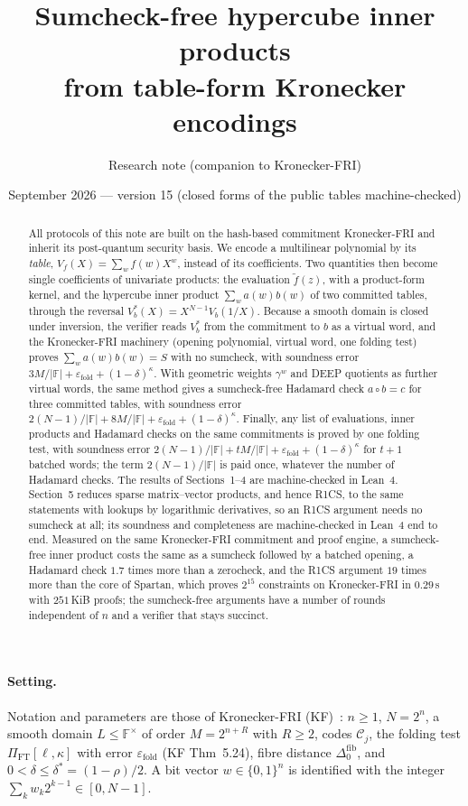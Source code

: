 \documentclass[11pt]{article}
\title{Sumcheck-free hypercube inner products\\ from table-form Kronecker encodings}
\author{Research note (companion to Kronecker-FRI)}
\date{September 2026 --- version 15 (closed forms of the public tables machine-checked)}
\theoremstyle{definition}
\newcommand{\F}{\mathbb{F}}
\newcommand{\Cc}{\mathcal{C}}
\newcommand{\iv}[2]{[#1,#2]}
\begin{document}
\maketitle

\begin{abstract}
All protocols of this note are built on the hash-based commitment Kronecker-FRI and inherit its post-quantum security basis. We encode a multilinear polynomial by its \emph{table}, $V_f(X)=\sum_{w}f(w)X^{w}$, instead of its coefficients.
Two quantities then become single coefficients of univariate products: the evaluation $\tilde f(z)$, with a product-form kernel, and the hypercube inner product $\sum_{w}a(w)b(w)$ of two committed tables, through the reversal $V_b^\ast(X)=X^{N-1}V_b(1/X)$.
Because a smooth domain is closed under inversion, the verifier reads $V_b^\ast$ from the commitment to $b$ as a virtual word, and the Kronecker-FRI machinery (opening polynomial, virtual word, one folding test) proves $\sum_w a(w)b(w)=S$ with no sumcheck, with soundness error $3M/|\F|+\varepsilon_{\mathrm{fold}}+(1-\delta)^\kappa$.
With geometric weights $\gamma^w$ and DEEP quotients as further virtual words, the same method gives a sumcheck-free Hadamard check $a\circ b=c$ for three committed tables, with soundness error $2(N-1)/|\F|+8M/|\F|+\varepsilon_{\mathrm{fold}}+(1-\delta)^\kappa$. Finally, any list of evaluations, inner products and Hadamard checks on the same commitments is proved by one folding test, with soundness error $2(N-1)/|\F|+tM/|\F|+\varepsilon_{\mathrm{fold}}+(1-\delta)^\kappa$ for $t+1$ batched words; the term $2(N-1)/|\F|$ is paid once, whatever the number of Hadamard checks. The results of Sections~1--4 are machine-checked in Lean~4. Section~5 reduces sparse matrix--vector products, and hence R1CS, to the same statements with lookups by logarithmic derivatives, so an R1CS argument needs no sumcheck at all; its soundness and completeness are machine-checked in Lean~4 end to end. Measured on the same Kronecker-FRI commitment and proof engine, a sumcheck-free inner product costs the same as a sumcheck followed by a batched opening, a Hadamard check $1.7$ times more than a zerocheck, and the R1CS argument $19$ times more than the core of Spartan, which proves $2^{15}$ constraints on Kronecker-FRI in $0.29$\,s with $251$\,KiB proofs; the sumcheck-free arguments have a number of rounds independent of $n$ and a verifier that stays succinct.
\end{abstract}

\paragraph{Setting.}
Notation and parameters are those of Kronecker-FRI (KF)~\cite{KF}: $n\ge1$, $N=2^n$, a smooth domain $L\le\F^\times$ of order $M=2^{n+R}$ with $R\ge2$, codes $\Cc_j$, the folding test $\Pi_{\mathrm{FT}}[\ell,\kappa]$ with error $\varepsilon_{\mathrm{fold}}$ (KF Thm~5.24), fibre distance $\Delta^{\mathrm{fib}}_0$, and $0<\delta\le\delta^\ast=(1-\rho)/2$.
A bit vector $w\in\{0,1\}^n$ is identified with the integer $\sum_k w_k2^{k-1}\in\iv{0}{N-1}$.
\end{document}
